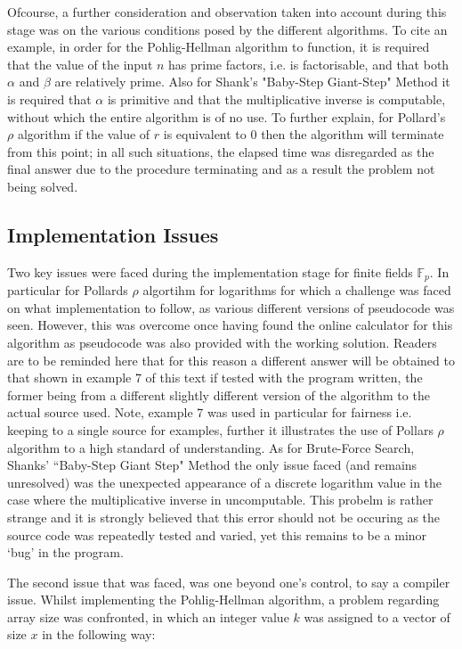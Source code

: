 \documentclass[iwp,first]{luthesis}
\begin{document}
Ofcourse, a further consideration and observation taken into account during this stage was on the various conditions posed by the different algorithms. To cite an example, in order for the Pohlig-Hellman algorithm to function, it is required that the value of the input $n$ has prime factors, i.e. is factorisable, and that both $\alpha$ and $\beta$ are relatively prime. Also for Shank's "Baby-Step Giant-Step" Method it is required that $\alpha$ is primitive and that the multiplicative inverse is computable, without which the entire algorithm is of no use. To further explain, for Pollard's $\rho$ algorithm if the value of $r$ is equivalent to 0 then the algorithm will terminate from this point; in all such situations, the elapsed time was disregarded as the final answer due to the procedure terminating and as a result the problem not being solved.




\subsection{Implementation Issues}

Two key issues were faced during the implementation stage for finite fields $\mathbb{F}_p$. In particular for Pollards $\rho$ algortihm for logarithms for which a challenge was faced on what implementation to follow, as various different versions of pseudocode was seen. However, this was overcome once having found the online calculator for this algorithm as pseudocode was also provided with the working solution. Readers are to be reminded here that for this reason a different answer will be obtained to that shown in example 7 of this text if tested with the program written, the former being from \cite{HAC} a different slightly different version of the algorithm to the actual source used. Note, example 7 was used in particular for fairness i.e. keeping to a single source for examples, further it illustrates the use of Pollars $\rho$ algorithm to a high standard of understanding. As for Brute-Force Search, Shanks' ``Baby-Step Giant Step" Method the only issue faced (and remains unresolved) was the unexpected appearance of a discrete logarithm value in the case where the multiplicative inverse in uncomputable. This probelm is rather strange and it is strongly believed that this error should not be occuring as the source code was repeatedly tested and varied, yet this remains to be a minor `bug' in the program.

The second issue that was faced, was one beyond one's control, to say a compiler issue. Whilst implementing the Pohlig-Hellman algorithm, a problem regarding array size was confronted, in which an integer value $k$ was assigned to a vector of size $x$ in the following way:
\end{document}
